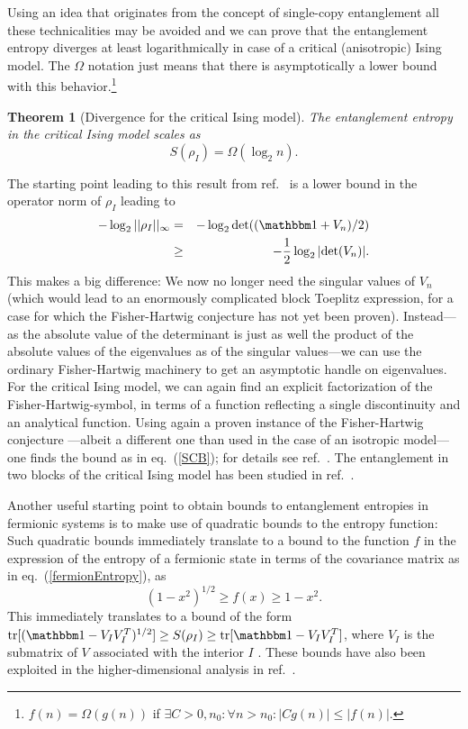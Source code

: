 \documentclass[rmp,twocolumn,floatfix,epsfig,graphics]{revtex4} %
\newtheorem{theorem}{Theorem}
\begin{document}
Using an idea that originates from the concept of single-copy 
entanglement all these technicalities may be avoided and we 
can prove that the entanglement entropy diverges at least 
logarithmically in case of a critical (anisotropic) Ising 
model. The $\Omega$ notation just means that there is 
asymptotically a lower bound with
this behavior.\footnote{$f(n)=\Omega(g(n))$ if
$\exists C>0,n_0:\forall n>n_0: |Cg(n)|\leq |f(n)|$.} 

\begin{theorem}[Divergence
for the critical Ising model]
The entanglement entropy in the critical Ising model scales as
\begin{equation}\label{SCB}
        S(\rho_I) = \Omega(\log_2 n).
\end{equation}
\end{theorem}

The starting point leading to this result from 
ref.\  \cite{Single} is a lower bound in the operator
norm of $\rho_I$ leading to
\begin{eqnarray}
        -\log_2 ||\rho_I||_{\infty}&=& -\log_2 \text{det}((\id +  V_n)/2)\nonumber\\
        &\geq&  -\frac{1}{2}\log_2 |\text{det}( V_n)|.
\end{eqnarray}
This makes a big difference: We now no longer need the 
singular values of $V_n$ (which would lead to an enormously 
complicated block Toeplitz expression, for a case for which 
the Fisher-Hartwig conjecture has not yet been proven).
Instead---as the absolute value of the determinant is just 
as well the product of the absolute values of the eigenvalues 
as of the singular values---we can use the ordinary 
Fisher-Hartwig machinery to get an asymptotic handle on 
eigenvalues. For the critical Ising model, we can again 
find an explicit factorization of the Fisher-Hartwig-symbol,
in terms of a function reflecting a single discontinuity and
an analytical function. Using again a proven instance of the 
Fisher-Hartwig conjecture \cite{Libby}---albeit a different 
one than used in the case of an isotropic model---one finds 
the bound as in eq.\ (\ref{SCB}); for details see
ref.\ \cite{Single}.  The entanglement in two blocks of the
critical Ising model has been studied in ref.\ 
\cite{Pascazio}.

Another useful starting point to obtain bounds to entanglement
entropies in fermionic systems is to make use of quadratic 
bounds to the entropy function: Such quadratic bounds 
immediately translate to a bound to the function $f$ in the 
expression of the entropy of a fermionic state in terms of 
the covariance matrix as in eq.\ (\ref{fermionEntropy}), as
\begin{equation}\label{fbound}
        ({1-x^2})^{1/2}\geq f(x)\geq 1-x^2.
\end{equation}
This immediately translates to a bound of the
form $\text{tr}[(\id - V_IV_I^T)^{1/2}]\geq S(\rho_I)\geq 
\text{tr}[\id - V_IV_I^T]$, where
$V_I$ is the submatrix of $V$
associated with the interior $I$ \cite{Fannes}. These bounds
have also been exploited in the higher-dimensional analysis in
ref.\ \cite{Wolf}.
\end{document}
